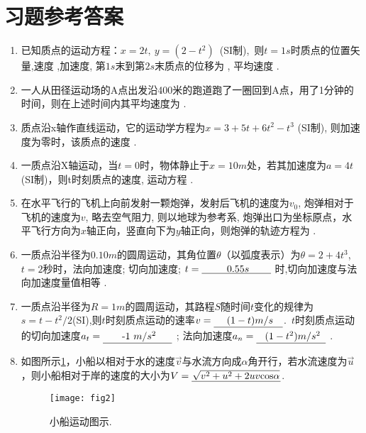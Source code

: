 \section{习题参考答案}
\begin{enumerate}
    \item 已知质点的运动方程：$x =2t,\ y =(2-t^2)$\ (SI制),\ 则$t=1s$时质点的位置矢量,速度 ,加速度, 第$1s$末到第$2s$末质点的位移为
    , 平均速度 .
    \item 一人从田径运动场的A点出发沿400米的跑道跑了一圈回到A点，用了1分钟的时间，则在上述时间内其平均速度为 .
    \item 质点沿x轴作直线运动，它的运动学方程为$x = 3+5t+6t^2-t^3$ (SI制), 则加速度为零时，该质点的速度 .
    \item 一质点沿X轴运动，当$t=0$时，物体静止于$x=10m$处，若其加速度为$a=4t$(SI制)，则t时刻质点的速度, 运动方程 .
    \item 在水平飞行的飞机上向前发射一颗炮弹，发射后飞机的速度为$v_0$, 炮弹相对于飞机的速度为$v$, 略去空气阻力, 则以地球为参考系, 炮弹出口为坐标原点，水平飞行方向为$x$轴正向，竖直向下为$y$轴正向，则炮弹的轨迹方程为  .
    \item 一质点沿半径为$0.10m$的圆周运动，其角位置$\theta$（以弧度表示）为$\theta=2+4t^3$,\ $t=2$秒时，法向加速度; 切向加速度; $t = \anl{$0.55 s$}$ 时,切向加速度与法向加速度量值相等 .
    \item 一质点沿半径为$R=1m$的圆周运动，其路程$S$随时间$t$变化的规律为$s=t-t^2/2$(SI),则$t$时刻质点运动的速率$v=\anl{$(1-t) m/s$}$.\ $t$时刻质点运动的切向加速度$a_t=\anl{-1 $m/s^2$}$ ; 法向加速度$a_n=\anl{$(1-t^2) m/s^2$}$ .
    \item 如图所示\ref{Fig:2}，小船以相对于水的速度$\vec{v}$与水流方向成$\alpha$角开行，若水流速度为$\vec{u}$，则小船相对于岸的速度的大小为$V=\underline{\makebox[9em]{$\sqrt{v^2+u^2+2uv\mathrm{cos}\alpha}$}}$.
    \begin{figure}[h]
        \centering
        \texttt{[image: fig2]}
        \caption{小船运动图示.}\label{Fig:2}
    \end{figure}
\end{enumerate}

